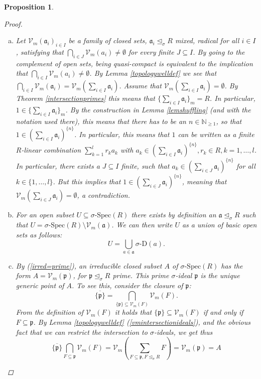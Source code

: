 \documentclass{article}
\def\NE{\mathbb{N}_{\geq1}}
\def\Vm{\mathcal{V}_m}
\def\V{\mathcal{V}}
\def\a{\mathfrak{a}}
\def\p{\mathfrak{p}}
\def\s{\sigma}
\def\si{\unlhd_{\sigma}}
\def\sSpec{\sigma\text{-Spec}}
\newenvironment{bew}{\begin{proof}[Proof]}{\end{proof}}
\theoremstyle{plain}
\newtheorem{prop}[Satz]{Proposition}
\theoremstyle{definition}
\begin{document}
\begin{prop}
\begin{bew}
\begin{enumerate}[(a)]
Now, by assumption, $\Vm(F)$ is irreducible, and thus it has to be that $\Vm(F) \subseteq \Vm([a])$ or $\Vm(F) \subseteq \Vm([b])$. By the bijectivity of the mapping in (\ref{orderreversingbij}) this means that $a \in F$ or $b \in F$.
\item Let $\Vm(\a_i)_{i \in I}$ be a family of closed sets, $\a_i \si R$ mixed, radical for all $i \in I$, satisfying that 
$\bigcap_{i \in J} \Vm( a_i) \neq \emptyset$ for every finite $J \subseteq I$. By  going to the complement of open sets, being quasi-compact is equivalent to the implication that $\bigcap_{i \in I} \Vm(a_i) \neq \emptyset$.
By Lemma \ref{topologywelldef} we see that $\bigcap_{i \in I} \Vm( \a_i) = \Vm ( \sum_{i \in I} \a_i)$. Assume that $ \Vm ( \sum_{i \in I} \a_i) = \emptyset$. 
By Theorem \ref{intersectionprimes} this means that $\{ \sum_{i \in I} \a_i \}_m = R$. In particular, $1 \in \{ \sum_{i \in I} \a_i \}_m$. By the construction in Lemma \ref{lemshuffling} (and with the notation used there), this means that there has to be an $n \in \NE$,
so that $1 \in (\sum_{i \in I} \a_i )^{\{n\}}$. In particular, this means that $1$ can be written as a finite $R$-linear combination $\sum_{k=1}^l r_k a_k$ with $a_k \in (\sum_{i \in I} \a_i )^{\{n\}}, r_k \in R, k = 1,\ldots,l$. In particular, there exists a $J \subseteq I$ finite,
such that $a_k \in (\sum_{i \in J} \a_i )^{\{n\}}$ for all $k \in \{1, \ldots, l \}$. But this implies that $1 \in (\sum_{i \in J} \a_i)^{\{n\}}$, meaning that $\Vm(\sum_{i \in J} \a_i) = \emptyset$, a contradiction. 
\item For an open subset $U \subseteq \sSpec(R)$ there exists by definition an $\a \si R$ such that $U = \sSpec(R) \setminus \Vm(\a)$. We can then write $U$ as a union of basic open sets as follows: $$U = \bigcup_{a \in \a} \s\text{-D}(a).$$
\item By (\ref{irred=prime}), an irreducible closed subset $A$ of $\sSpec(R)$ has the form $A = \Vm(\p)$, for $\p \si R$ prime. This prime $\s$-ideal $\p$ is the unique generic point of $A$.
To see this, consider the closure of $\p$: $$\overline{\{\p\}} = \bigcap_{\{\p\} \subseteq \Vm(F)}\Vm(F).$$ From the definition of $\Vm(F)$ it holds that $\{\p\} \subseteq \V_m(F)$ if and only if $F \subseteq \p$. By Lemma \ref{topologywelldef} (\ref{vmintersectionideals}), and the obvious fact that we can restrict the intersection to $\s$-ideals, we get thus
\[ \overline{\{\p\}} \bigcap_{F \subseteq \p}\Vm(F) = \Vm(\sum_{F \subseteq \p, F \si R} F) = \Vm(\p) = A \]
\end{enumerate}
\end{bew}
\end{prop}
\end{document}
